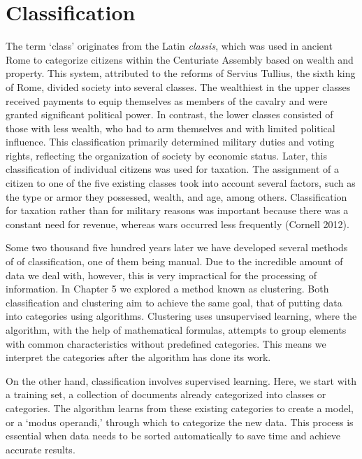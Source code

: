 \chapter{Classification}\label{sec-classification}

The term `class' originates from the Latin \textit{classis}, which was used in
ancient Rome to categorize citizens within the Centuriate Assembly based
on wealth and property. This system, attributed to the reforms of
Servius Tullius, the sixth king of Rome, divided society into several
classes. The wealthiest in the upper classes received payments to equip themselves as members of the cavalry and were granted significant political power. In contrast, the lower
classes consisted of those with less wealth, who had to arm themselves and with limited political influence. This classification
primarily determined military duties and voting rights, reflecting the
organization of society by economic status. Later, this classification
of individual citizens was used for taxation. The assignment of
a citizen to one of the five existing classes took into account several factors,
such as the type or armor they possessed, wealth, and age, among others.
Classification for taxation rather than for military reasons was important
because there was a constant need for revenue, whereas wars occurred less frequently (Cornell 2012).

Some two thousand five hundred years later we have developed
several methods of of classification, one of them being
manual. Due to the incredible amount of data we deal with, however, this is very
impractical for the processing of information. In Chapter 5 we explored a method
known as clustering. Both classification and clustering aim to achieve
the same goal, that of putting data into categories using algorithms. Clustering
uses unsupervised learning, where the algorithm, with the help of
mathematical formulas, attempts to group elements with common
characteristics without predefined categories. This means we interpret
the categories after the algorithm has done its work.

On the other hand, classification involves supervised learning. Here, we
start with a training set, a collection of documents already categorized
into classes or categories. The algorithm learns from these existing
categories to create a model, or a `modus operandi,' through which to categorize
the new data. This process is essential when data needs to be sorted
automatically to save time and achieve accurate results.

